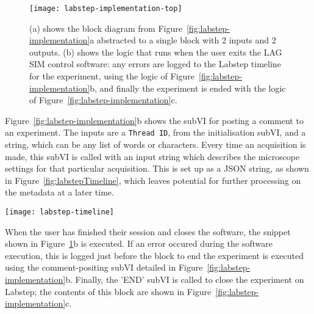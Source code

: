 \begin{figure}[tbp]
\centering
\texttt{[image: labstep-implementation-top]}
\caption[Top level functions for uploading to Labstep]{(a) shows the block diagram from Figure~\ref{fig:labstep-implementation}a abstracted to a single block with 2 inputs and 2 outputs. (b) shows the logic that runs when the user exits the LAG SIM control software: any errors are logged to the Labstep timeline for the experiment, using the logic of Figure~\ref{fig:labstep-implementation}b, and finally the experiment is ended with the logic of Figure~\ref{fig:labstep-implementation}c. } 
\label{fig:labstep-implementation-top}
\end{figure}

Figure~\ref{fig:labstep-implementation}b shows the subVI for posting a comment to an experiment.
The inputs are a \texttt{Thread ID}, from the initialisation subVI, and a string, which can be any list of words or characters.
Every time an acquisition is made, this subVI is called with an input string which describes the microscope settings for that particular acquisition. 
This is set up as a JSON string, as shown in Figure~\ref{fig:labstepTimeline}, which leaves potential for further processing on the metadata at a later time. 

\begin{sidewaysfigure}[p]
\centering
\texttt{[image: labstep-timeline]}
\caption[Logging user activity with Labstep allows any problems to be identified and fixed quickly]{User activity is automatically logged to an online logbook hosted on Labstep to identify and fix any problems quickly. The left-hand screenshot shows the users which have used the LAG SIM between 27-04-2019 and 08-05-2019; opening one of these experiments (right) shows each of the acquisitions with the instrument parameters recorded in JSON format.}
\label{fig:labstepTimeline}
\end{sidewaysfigure}

When the user has finished their session and closes the software, the snippet shown in Figure~\ref{fig:labstep-implementation-top}b is executed. 
If an error occured during the software execution, this is logged just before the block to end the experiment is executed using the comment-positing subVI detailed in Figure~\ref{fig:labstep-implementation}b. 
Finally, the 'END' subVI is called to close the experiment on Labstep; the contents of this block are shown in Figure~\ref{fig:labstep-implementation}c. 

